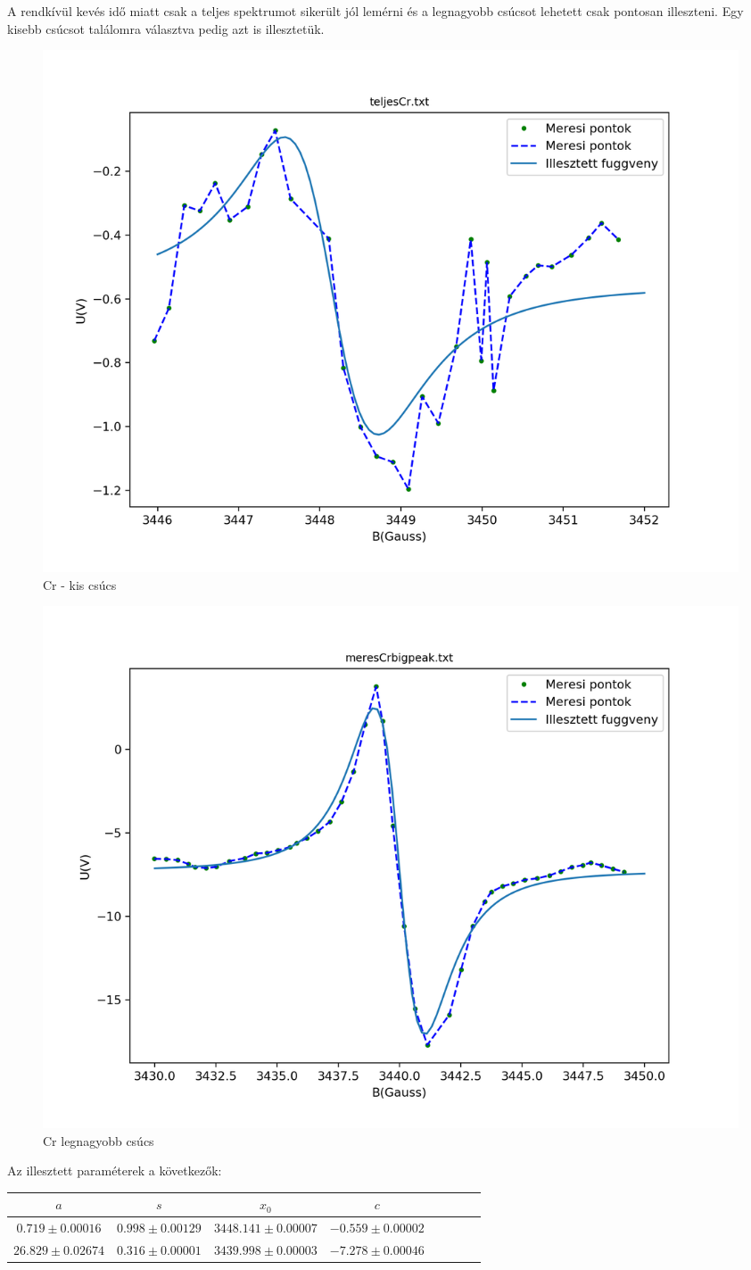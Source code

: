 \documentclass[12pt,a4paper]{article}
\theoremstyle{plain}
\begin{document}
\par A rendkívül kevés idő miatt csak a teljes spektrumot
sikerült jól lemérni és a legnagyobb csúcsot lehetett csak
pontosan illeszteni. Egy kisebb csúcsot találomra
választva pedig azt is illesztetük.

\begin{figure}[H]
    \centering
    \includegraphics[width=.65\linewidth]{./images/alex_meres_cr_small.png}
    \caption{Cr - kis csúcs}
\end{figure}

\begin{figure}[H]
    \centering
    \includegraphics[width=.65\linewidth]{./images/alex_meres_cr_big.png}
    \caption{Cr legnagyobb csúcs}
\end{figure}

\par Az illesztett paraméterek
a következők:

\begin{table}[H]
    \begin{center}
        \begin{tabular}{|c|c|c|c|c|c|c|c|}
            \hline
            $a$                  & $s$                 & $x_0$                  & $c$                  \\ \hline
            $0.719 \pm 0.00016$  & $0.998 \pm 0.00129$ & $3448.141 \pm 0.00007$ & $-0.559 \pm 0.00002$ \\ \hline
            $26.829 \pm 0.02674$ & $0.316 \pm 0.00001$ & $3439.998 \pm 0.00003$ & $-7.278 \pm 0.00046$ \\ \hline
        \end{tabular}
        \label{tab:3}
    \end{center}
\end{table}
\end{document}
